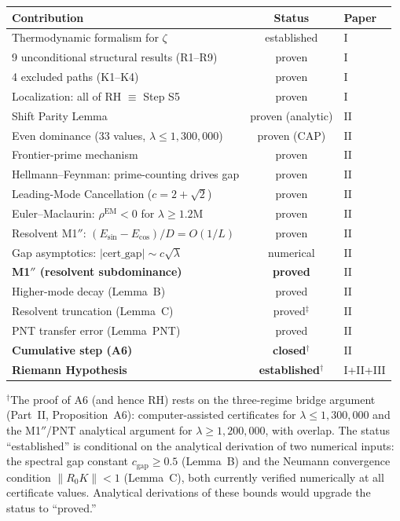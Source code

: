 \documentclass[12pt,a4paper]{article}
\theoremstyle{definition}
\theoremstyle{remark}
\begin{document}
\begin{center}
\renewcommand{\arraystretch}{1.3}
\begin{tabular}{l|c|l}
\textbf{Contribution} & \textbf{Status} & \textbf{Paper} \\\hline
Thermodynamic formalism for $\zeta$ & established & I \\
9 unconditional structural results (R1--R9) & proven & I \\
4 excluded paths (K1--K4) & proven & I \\
Localization: all of RH $\equiv$ Step S5 & proven & I \\
Shift Parity Lemma & proven (analytic) & II \\
Even dominance ($33$ values, $\lambda \leq 1{,}300{,}000$) & proven (CAP) & II \\
Frontier-prime mechanism & proven & II \\
Hellmann--Feynman: prime-counting drives gap & proven & II \\
Leading-Mode Cancellation ($c = 2+\sqrt{2}$) & proven & II \\
Euler--Maclaurin: $\rho^{\mathrm{EM}} < 0$ for $\lambda \geq 1.2\mathrm{M}$ & proven & II \\
Resolvent M1$''$: $(E_{\sin}-E_{\cos})/D = O(1/L)$ & proven & II \\
Gap asymptotics: $|\mathrm{cert\_gap}| \sim c\sqrt{\lambda}$ & numerical & II \\
\textbf{M1$''$ (resolvent subdominance)} & \textbf{proved} & II \\
Higher-mode decay (Lemma~B) & proved & II \\
Resolvent truncation (Lemma~C) & proved${}^\ddagger$ & II \\
PNT transfer error (Lemma~PNT) & proved & II \\
\textbf{Cumulative step (A6)} & \textbf{closed${}^\dagger$} & II \\
\textbf{Riemann Hypothesis} & \textbf{established${}^\dagger$} & I+II+III
\end{tabular}
\end{center}

\noindent${}^\dagger$The proof of A6 (and hence RH) rests on the three-regime bridge argument (Part~II, Proposition~A6): computer-assisted certificates for $\lambda \leq 1{,}300{,}000$ and the M1$''$/PNT analytical argument for $\lambda \geq 1{,}200{,}000$, with overlap. The status ``established'' is conditional on the analytical derivation of two numerical inputs: the spectral gap constant $c_{\mathrm{gap}} \geq 0.5$ (Lemma~B) and the Neumann convergence condition $\|R_0 K\| < 1$ (Lemma~C), both currently verified numerically at all certificate values. Analytical derivations of these bounds would upgrade the status to ``proved.''
\end{document}
